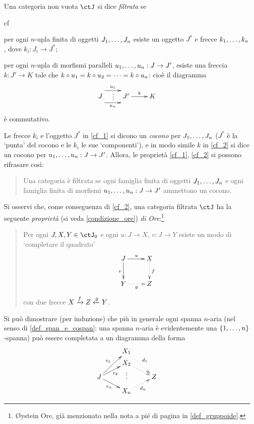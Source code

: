 \begin{definition}\label{def_cat_filtrata}
	Una categoria non vuota \(\ctJ\) si dice \emph{filtrata} se
	\begin{enumtag}{cf}
		\item \label{cf_1} per ogni \(n\)-upla finita di oggetti \(\tup Jn,\) esiste un oggetto \(J^*\) e frecce \(\tup kn,\), dove \(k_i : J_i\to J^*\);
		\item \label{cf_2} per ogni \(n\)-upla di morfismi paralleli \(\tup un, : J\to J'\), esiste una freccia \(k : J'\to K\) tale che \(k\circ u_1 = k\circ u_2 = \dots = k \circ u_n\): cioè il diagramma
		\[\xymatrix{
			J \ar@<.75pc>[r]^-{u_1} \ar@{}@<.2pc>[r]|\vdots\ar@<-.75pc>[r]_-{u_n} & J' \ar[r]^-k & K
			}\]
		è commutativo.
	\end{enumtag}
	Le frecce \(k_i\) e l'oggetto \(J^*\) in \ref{cf_1} si dicono un \emph{cocono} per \(\tup Jn,\) (\(J^*\) è la `punta' del cocono e le \(k_i\) le sue `componenti'), e in modo simile \(k\) in \ref{cf_2} si dice un cocono per \(\tup un, : J\to J'\). Allora, le proprietà \ref{cf_1}, \ref{cf_2} si possono rifrasare così:
	\begin{quote}
		Una categoria è filtrata se ogni famiglia finita di oggetti \(\tup Jn,\) e ogni famiglia finita di morfismi \(\tup un, : J\to J'\) ammettono un cocono.
	\end{quote}
	Si osservi che, come conseguenza di \ref{cf_2}, una categoria filtrata \(\ctJ\) ha la seguente \emph{proprietà} (si veda \ref{condizione_ore}) \emph{di Ore}:\footnote{Øystein Ore, già menzionato nella nota a pié di pagina in \ref{def_gruppoide}.}
	\begin{quote}
		Per ogni \(J,X,Y\in\ctJ_0\) e ogni \(u : J\to X\), \(v : J\to Y\) esiste un modo di `completare il quadrato'
		\[\xymatrix{
				J\ar[r]^u\ar[d]_v & X \ar@{.>}[d]^{f}\\
				Y \ar@{.>}[r]_{g} & Z
			}\]
		con due frecce \(X \xrightarrow{f}Z \xleftarrow{g} Y\).
	\end{quote}
\end{definition}
Si può dimostrare (per induzione) che più in generale ogni spanna \(n\)-aria (nel senso di \ref{def_span_e_cospan}: una spanna \(n\)-aria è evidentemente una \(\{\iter n\}\)-spanna) può essere completata a un diagramma della forma
\[\xymatrix@R=1mm{
	& X_1\ar@{.>}[ddr]^{d_1}\\
	& X_2\ar@{.>}[dr]\\
	J \ar[uur]^-{v_1}\ar[ur]_{v_2}\ar[dr]_-{v_n} & \vdots & Z\\
	& X_n\ar@{.>}[ur]_{d_n}
	}\]
